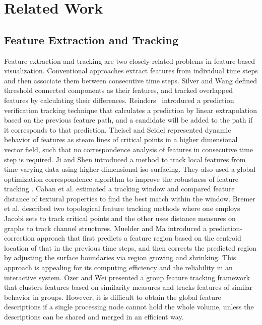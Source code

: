 \section{Related Work}

\subsection{Feature Extraction and Tracking}

Feature extraction and tracking are two closely related problems in feature-based visualization. Conventional approaches extract features from individual time steps and then associate them between consecutive time steps. Silver and Wang \cite{Silver1997} defined threshold connected components as their features, and tracked overlapped features by calculating their differences. Reinders~\cite{Reinders2001} introduced a prediction verification tracking technique that calculates a prediction by linear extrapolation based on the previous feature path, and a candidate will be added to the path if it corresponds to that prediction. Theisel and Seidel \cite{Theisel2003} represented dynamic behavior of features as steam lines of critical points in a higher dimensional vector field, such that no correspondence analysis of features in consecutive time step is required. Ji and Shen \cite{Ji2003} introduced a method to track local features from time-varying data using higher-dimensional iso-surfacing. They also used a global optimization correspondence algorithm to improve the robustness of feature tracking \cite{Ji2006}. Caban et al. \cite{Caban2007} estimated a tracking window and compared feature distance of textural properties to find the best match within the window. Bremer et al. \cite{Bremer2007} described two topological feature tracking methods where one employs Jacobi sets to track critical points and the other uses distance measures on graphs to track channel structures. Muelder and Ma \cite{Muelder2009} introduced a prediction-correction approach that first predicts a feature region based on the centroid location of that in the previous time steps, and then corrects the predicted region by adjusting the surface boundaries via region growing and shrinking. This approach is appealing for its computing efficiency and the reliability in an interactive system. Ozer and Wei presented a group feature tracking framework\cite{Ozer2012} that clusters features based on similarity measures and tracks features of similar behavior in groups. However, it is difficult to obtain the global feature descriptions if a single processing node cannot hold the whole volume, unless the descriptions can be shared and merged in an efficient way.

